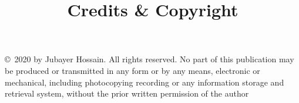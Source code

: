 \title{Credits & Copyright}
\null\vfill
\noindent\copyright~2020 by Jubayer Hossain. All rights reserved. No part of this publication may be produced or transmitted in any form or by any means, electronic or mechanical, including photocopying recording or any information storage and retrieval system, without the prior written permission of the author 

